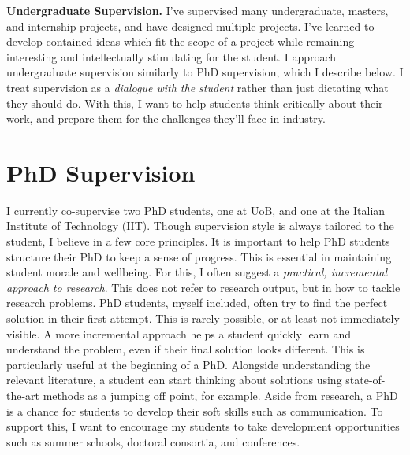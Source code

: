 \documentclass[12pt]{article}
\begin{document}
\vspace*{1ex}\noindent\textbf{Undergraduate Supervision.} I've supervised many undergraduate, masters, and internship projects, and have designed multiple projects.
%
I've learned to develop contained ideas which fit the scope of a project while remaining interesting and intellectually stimulating for the student.
%
I approach undergraduate supervision similarly to PhD supervision, which I describe below.
%
I treat supervision as a \emph{dialogue with the student} rather than just dictating what they should do.
%
With this, I want to help students think critically about their work, and prepare them for the challenges they'll face in industry.

\section*{PhD Supervision}
%
I currently co-supervise two PhD students, one at UoB, and one at the Italian Institute of Technology (IIT).
%
Though supervision style is always tailored to the student, I believe in a few core principles.
%
It is important to help PhD students structure their PhD to keep a sense of progress.
%
This is essential in maintaining student morale and wellbeing.
%
For this, I often suggest a \emph{practical, incremental approach to research}.
%
This does not refer to research output, but in how to tackle research problems.
%
PhD students, myself included, often try to find the perfect solution in their first attempt.
%
This is rarely possible, or at least not immediately visible.
%
A more incremental approach helps a student quickly learn and understand the problem, even if their final solution looks different.
%
This is particularly useful at the beginning of a PhD.
%
Alongside understanding the relevant literature, a student can start thinking about solutions using state-of-the-art methods as a jumping off point, for example.
%
Aside from research, a PhD is a chance for students to develop their soft skills such as communication.
%
To support this, I want to encourage my students to take development opportunities such as summer schools, doctoral consortia, and conferences.

\end{document}
